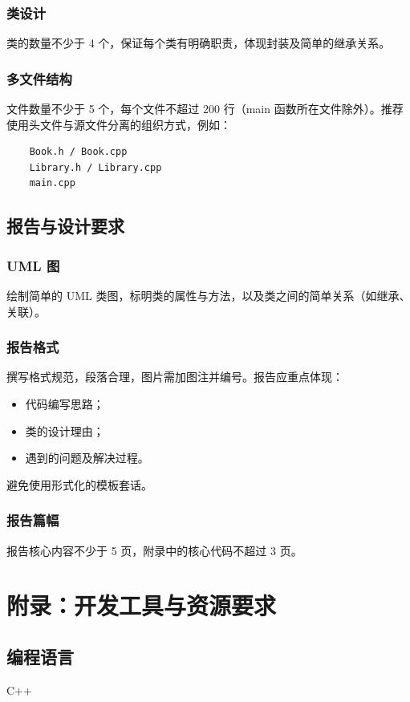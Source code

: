 \subsubsection{类设计}
类的数量不少于 4 个，保证每个类有明确职责，体现封装及简单的继承关系。

\subsubsection{多文件结构}
文件数量不少于 5 个，每个文件不超过 200 行（main 函数所在文件除外）。推荐使用头文件与源文件分离的组织方式，例如：
\begin{verbatim}
	Book.h / Book.cpp
	Library.h / Library.cpp
	main.cpp
\end{verbatim}

\subsection{报告与设计要求}
\subsubsection{UML 图}
绘制简单的 UML 类图，标明类的属性与方法，以及类之间的简单关系（如继承、关联）。

\subsubsection{报告格式}
撰写格式规范，段落合理，图片需加图注并编号。报告应重点体现：
\begin{itemize}
	\item 代码编写思路；
	\item 类的设计理由；
	\item 遇到的问题及解决过程。
\end{itemize}
避免使用形式化的模板套话。


\subsubsection{报告篇幅}
报告核心内容不少于 5 页，附录中的核心代码不超过 3 页。



\section{附录：开发工具与资源要求}\label{app:tool}

\subsection{编程语言}
C++

